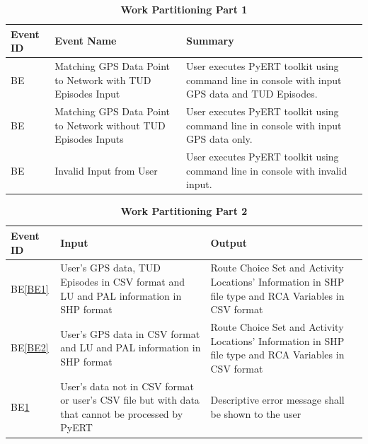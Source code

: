 \documentclass[12pt, titlepage]{article}
\newcounter{benum}
\newcommand{\bethebenum}{BE\thebenum}
\newcommand{\beref}[1]{BE\ref{#1}}
\begin{document}
\begin{table}[H]
\begin{tabular}{|p{5cm}|p{5cm}|p{5cm}|}
\hline
{\bf Event ID} & {\bf Event Name} & {\bf Summary} \\ 
\hline
 {benum} \bethebenum \label{BE1} & Matching GPS Data Point to Network with TUD Episodes Input & User executes PyERT toolkit using command line in console with input GPS data and TUD Episodes. \\ 
\hline
 {benum} \bethebenum \label{BE2} & Matching GPS Data Point to Network without TUD Episodes Inputs & User executes PyERT toolkit using command line in console with input GPS data only. \\ 
\hline
 {benum} \bethebenum \label{BE3} & Invalid Input from User & User executes PyERT toolkit using command line in console with invalid input. \\
\hline
\end{tabular}
\caption{\bf Work Partitioning Part 1}
\end{table}

\begin{table}[H]
\begin{tabular}{|p{5cm}|p{5cm}|p{5cm}|}
\hline
{\bf Event ID} & {\bf Input} & {\bf Output} \\ 
\hline
\beref{BE1} & User's GPS data, TUD Episodes in CSV format and LU and PAL information in SHP format & Route Choice Set and Activity Locations' Information in SHP file type and RCA Variables in CSV format  \\ 
\hline
\beref{BE2} & User's GPS data in CSV format and LU and PAL information in SHP format & Route Choice Set and Activity Locations' Information in SHP file type and RCA Variables in CSV format \\ 
\hline
\beref{BE3} & User's data not in CSV format or user's CSV file but with data that cannot be processed by PyERT & Descriptive error message shall be shown to the user \\ 
\hline
\end{tabular}
\caption{\bf Work Partitioning Part 2}
\end{table}

\newpage
\end{document}
